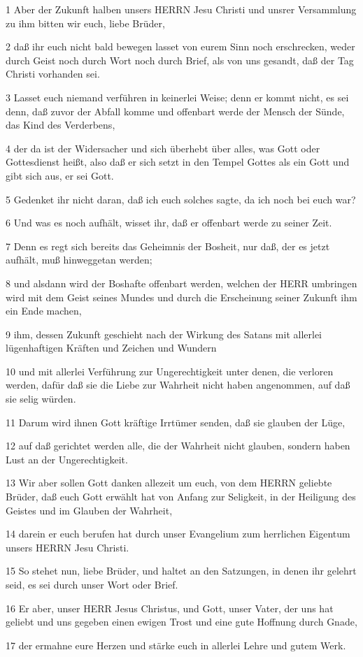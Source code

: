 \par 1 Aber der Zukunft halben unsers HERRN Jesu Christi und unsrer Versammlung zu ihm bitten wir euch, liebe Brüder,
\par 2 daß ihr euch nicht bald bewegen lasset von eurem Sinn noch erschrecken, weder durch Geist noch durch Wort noch durch Brief, als von uns gesandt, daß der Tag Christi vorhanden sei.
\par 3 Lasset euch niemand verführen in keinerlei Weise; denn er kommt nicht, es sei denn, daß zuvor der Abfall komme und offenbart werde der Mensch der Sünde, das Kind des Verderbens,
\par 4 der da ist der Widersacher und sich überhebt über alles, was Gott oder Gottesdienst heißt, also daß er sich setzt in den Tempel Gottes als ein Gott und gibt sich aus, er sei Gott.
\par 5 Gedenket ihr nicht daran, daß ich euch solches sagte, da ich noch bei euch war?
\par 6 Und was es noch aufhält, wisset ihr, daß er offenbart werde zu seiner Zeit.
\par 7 Denn es regt sich bereits das Geheimnis der Bosheit, nur daß, der es jetzt aufhält, muß hinweggetan werden;
\par 8 und alsdann wird der Boshafte offenbart werden, welchen der HERR umbringen wird mit dem Geist seines Mundes und durch die Erscheinung seiner Zukunft ihm ein Ende machen,
\par 9 ihm, dessen Zukunft geschieht nach der Wirkung des Satans mit allerlei lügenhaftigen Kräften und Zeichen und Wundern
\par 10 und mit allerlei Verführung zur Ungerechtigkeit unter denen, die verloren werden, dafür daß sie die Liebe zur Wahrheit nicht haben angenommen, auf daß sie selig würden.
\par 11 Darum wird ihnen Gott kräftige Irrtümer senden, daß sie glauben der Lüge,
\par 12 auf daß gerichtet werden alle, die der Wahrheit nicht glauben, sondern haben Lust an der Ungerechtigkeit.
\par 13 Wir aber sollen Gott danken allezeit um euch, von dem HERRN geliebte Brüder, daß euch Gott erwählt hat von Anfang zur Seligkeit, in der Heiligung des Geistes und im Glauben der Wahrheit,
\par 14 darein er euch berufen hat durch unser Evangelium zum herrlichen Eigentum unsers HERRN Jesu Christi.
\par 15 So stehet nun, liebe Brüder, und haltet an den Satzungen, in denen ihr gelehrt seid, es sei durch unser Wort oder Brief.
\par 16 Er aber, unser HERR Jesus Christus, und Gott, unser Vater, der uns hat geliebt und uns gegeben einen ewigen Trost und eine gute Hoffnung durch Gnade,
\par 17 der ermahne eure Herzen und stärke euch in allerlei Lehre und gutem Werk.

